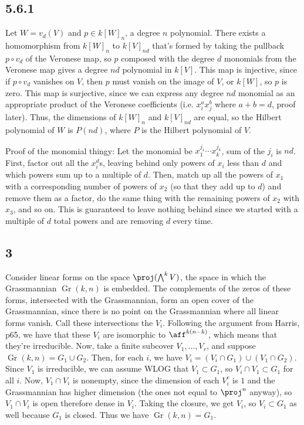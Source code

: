 \documentclass{article}
\DeclareMathOperator{\Gr}{Gr}
\begin{document}
\subsection*{5.6.1}
Let $W=v_d(V)$ and $p\in k[W]_n$, a degree $n$ polynomial. There exists a homomorphism from $k[W]_n$ to $k[V]_{nd}$ that's formed by taking the pullback $p\circ v_d$ of the Veronese map, so $p$ composed with the degree $d$ monomials from the Veronese map gives a degree $nd$ polynomial in $k[V]$. This map is injective, since if $p\circ v_d$ vanishes on $V$, then $p$ must vanish on the image of $V$, or $k[W]$, so $p$ is zero. This map is surjective, since we can express any degree $nd$ monomial as an appropriate product of the Veronese coefficients (i.e. $x_i^ax_j^b$ where $a+b=d$, proof later). Thus, the dimensions of $k[W]_n$ and $k[V]_{nd}$ are equal, so the Hilbert polynomial of $W$ is $P(nd)$, where $P$ is the Hilbert polynomial of $V$.

Proof of the monomial thingy: Let the monomial be $x_1^{j_1}\cdots x_k^{j_k}$, sum of the $j_i$ is $nd$. First, factor out all the $x_i^d$s, leaving behind only powers of $x_i$ less than $d$ and which powers sum up to a multiple of $d$. Then, match up all the powers of $x_1$ with a corresponding number of powers of $x_2$ (so that they add up to $d$) and remove them as a factor, do the same thing with the remaining powers of $x_2$ with $x_3$, and so on. This is guaranteed to leave nothing behind since we started with a multiple of $d$ total powers and are removing $d$ every time.
\subsection*{3}
Consider linear forms on the space $\proj(\bigwedge^k V)$, the space in which the Grassmannian $\Gr(k,n)$ is embedded. The complements of the zeros of these forms, intersected with the Grassmannian, form an open cover of the Grassmannian, since there is no point on the Grassmannian where all linear forms vanish. Call these intersections the $V_i$. Following the argument from Harris, p65, we have that these $V_i$ are isomorphic to $\aff^{k(n-k)}$, which means that they're irreducible. Now, take a finite subcover $V_1,\ldots,V_r$, and suppose $\Gr(k,n)=G_1\cup G_2$. Then, for each $i$, we have $V_i=(V_i\cap G_1)\cup(V_1\cap G_2)$. Since $V_1$ is irreducible, we can assume WLOG that $V_1\subset G_1$, so $V_i\cap V_1\subset G_1$ for all $i$. Now, $V_1\cap V_i$ is nonempty, since the dimension of each $V_i^c$ is $1$ and the Grassmannian has higher dimension (the ones not equal to $\proj^n$ anyway), so $V_1\cap V_i$ is open therefore dense in $V_i$. Taking the closure, we get $V_i$, so $V_i\subset G_1$ as well because $G_1$ is closed. Thus we have $\Gr(k,n)=G_1$. 
\end{document}

